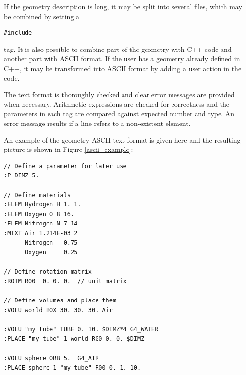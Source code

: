 If the geometry description is long, it may be split into several files, which
may be combined by setting a
\begin{verbatim}
#include
\end{verbatim}
tag.  It is also possible to combine part of the geometry with C++ code and
another part with ASCII format.  If the user has a geometry already defined in
C++, it may be transformed into ASCII format by adding a user action in the
code.

The text format is thoroughly checked and clear error messages are provided 
when necessary.  Arithmetic expressions are checked for correctness and the 
parameters in each tag are compared against expected number and type.  An error 
message results if a line refers to a non-existent element.

An example of the geometry ASCII text format is given here and the resulting
picture is shown in Figure \ref{ascii_example}:

\begin{verbatim}
// Define a parameter for later use
:P DIMZ 5.

// Define materials
:ELEM Hydrogen H 1. 1.
:ELEM Oxygen O 8 16.
:ELEM Nitrogen N 7 14.
:MIXT Air 1.214E-03 2
      Nitrogen   0.75
      Oxygen     0.25

// Define rotation matrix
:ROTM R00  0. 0. 0.  // unit matrix

// Define volumes and place them
:VOLU world BOX 30. 30. 30. Air

:VOLU "my tube" TUBE 0. 10. $DIMZ*4 G4_WATER
:PLACE "my tube" 1 world R00 0. 0. $DIMZ

:VOLU sphere ORB 5.  G4_AIR
:PLACE sphere 1 "my tube" R00 0. 1. 10.
\end{verbatim}


